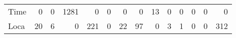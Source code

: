\begin{table}[htbp!]
\begin{adjustbox}{width=1\textwidth}
\begin{tabular}{lrrrrrrrrrrrrr}
Time     &                  0 &                0 &              1281 &                 0 &                 0 &                0 &                 0 &                13 &                0 &                 0 &                 0 &                   0 &                0 \\
Loca     &                 20 &                6 &                 0 &               221 &                 0 &               22 &                97 &                 0 &                3 &                 1 &                 0 &                   0 &              312 \\
\bottomrule
\end{tabular}
\end{adjustbox}
\end{table}
